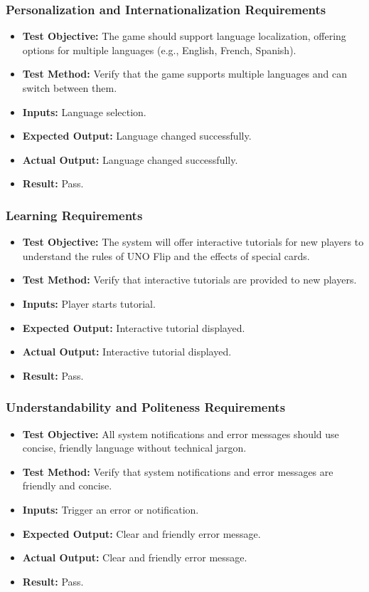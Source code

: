 \documentclass[12pt, titlepage]{article}
\begin{document}
\subsubsection{Personalization and Internationalization Requirements}
\begin{itemize}
    \item \textbf{Test Objective:} The game should support language localization, offering options for multiple languages (e.g., English, French, Spanish).
    \item \textbf{Test Method:} Verify that the game supports multiple languages and can switch between them.
    \item \textbf{Inputs:} Language selection.
    \item \textbf{Expected Output:} Language changed successfully.
    \item \textbf{Actual Output:} Language changed successfully.
    \item \textbf{Result:} Pass.
\end{itemize}

\subsubsection{Learning Requirements}
\begin{itemize}
    \item \textbf{Test Objective:} The system will offer interactive tutorials for new players to understand the rules of UNO Flip and the effects of special cards.
    \item \textbf{Test Method:} Verify that interactive tutorials are provided to new players.
    \item \textbf{Inputs:} Player starts tutorial.
    \item \textbf{Expected Output:} Interactive tutorial displayed.
    \item \textbf{Actual Output:} Interactive tutorial displayed.
    \item \textbf{Result:} Pass.
\end{itemize}

\subsubsection{Understandability and Politeness Requirements}
\begin{itemize}
    \item \textbf{Test Objective:} All system notifications and error messages should use concise, friendly language without technical jargon.
    \item \textbf{Test Method:} Verify that system notifications and error messages are friendly and concise.
    \item \textbf{Inputs:} Trigger an error or notification.
    \item \textbf{Expected Output:} Clear and friendly error message.
    \item \textbf{Actual Output:} Clear and friendly error message.
    \item \textbf{Result:} Pass.
\end{itemize}
\end{document}
